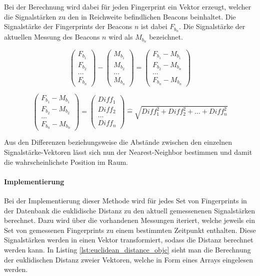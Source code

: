 Bei der Berechnung wird dabei für jeden Fingerprint ein Vektor erzeugt, welcher die Signalstärken zu den in Reichweite befindlichen Beacons beinhaltet.
Die Signalstärke der Fingerprints der Beacons $n$ ist dabei $F_{b_n}$.
Die Signalstärke der aktuellen Messung des Beacons $n$ wird als $M_{b_n}$ bezeichnet.


\begin{equation}
	\begin{pmatrix}
		F_{b_1} \\
		F_{b_2} \\
		... \\
		F_{b_n}
	\end{pmatrix} -
	\begin{pmatrix}
		M_{b_1} \\
		M_{b_2} \\
		... \\
		M_{b_n}
	\end{pmatrix}
	= 
	\begin{pmatrix}
		F_{b_1} - M_{b_1} \\
		F_{b_2} - M_{b_n} \\
		... \\
		F_{b_n} - M_{b_n}
	\end{pmatrix}
\end{equation}

\begin{equation}
	\begin{pmatrix}
		F_{b_1} - M_{b_1} \\
		F_{b_2} - M_{b_2} \\
		... \\
		F_{b_n} - M_{b_n}
	\end{pmatrix}
	=
	\begin{pmatrix}
		Diff_1 \\
		Diff_2 \\
		... \\
		Diff_n
	\end{pmatrix}
	\widehat{=}
	\sqrt{Diff_1^2 + Diff_2^2 + ... + Diff_n^2}
\end{equation}

Aus den Differenzen beziehungsweise die Abstände zwischen den einzelnen Signalstärke-Vektoren lässt sich nun der Nearest-Neighbor bestimmen und damit die wahrscheinlichste Position im Raum.

\paragraph{Implementierung}
\label{sec:}
Bei der Implementierung dieser Methode wird für jedes Set von Fingerprints in der Datenbank die euklidische Distanz zu den aktuell gemessenenen Signalstärken berechnet. Dazu wird über die vorhandenen Messungen iteriert, welche jeweils ein Set von gemessenen Fingerprints zu einem bestimmten Zeitpunkt enthalten. Diese Signalstärken werden in einen Vektor transformiert, sodass die Distanz berechnet werden kann. In Listing \ref{lst:euclidean_distance_objc} sieht man die Berechnung der euklidischen Distanz zweier Vektoren, welche in Form eines Arrays eingelesen werden.

